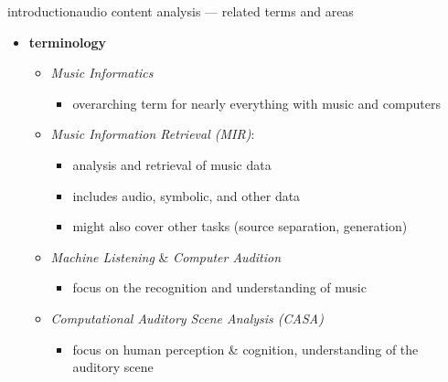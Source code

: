         \begin{frame}{introduction}{audio content analysis --- related terms and areas}
            \begin{itemize}
                \item   \textbf{terminology}
                    \begin{itemize}
                        \item   \textit{Music Informatics}
                            \begin{itemize}
                                \item   overarching term for nearly everything with music and computers
                            \end{itemize}
                                
                        \smallskip
                        \item	\textit{Music Information Retrieval (MIR)}:
                            \begin{itemize}
                                \item   analysis and retrieval of music data 
                                \item   includes audio, symbolic, and other data
                                \item   might also cover other tasks (source separation, generation)
                            \end{itemize}
                                
                        \smallskip
                        \item	\textit{Machine Listening} \& \textit{Computer Audition}
                            \begin{itemize}
                                \item   focus on the recognition and understanding of music
                            \end{itemize}
                            
                        \smallskip
                        \item	\textit{Computational Auditory Scene Analysis (CASA)}
                            \begin{itemize}
                                \item   focus on human perception \& cognition, understanding of the auditory scene
                            \end{itemize}
                    \end{itemize}
           \end{itemize}
        \end{frame}
